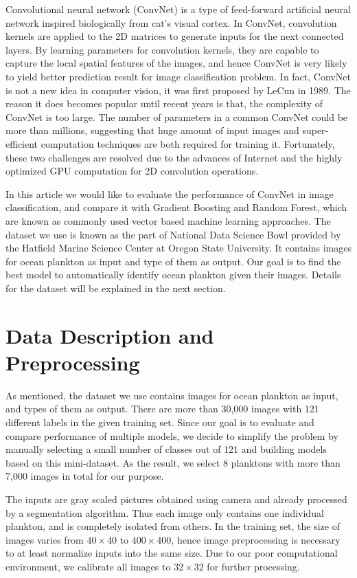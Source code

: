 \documentclass[11pt,oneside,a4paper]{article}
\numberwithin{equation}{section}
\begin{document}
Convolutional neural network (ConvNet) is a type of feed-forward artificial neural network inspired biologically from cat's visual cortex\cite{hubel1968receptive}. In ConvNet, convolution kernels are applied to the 2D matrices to generate inputs for the next connected layers. By learning parameters for convolution kernels, they are capable to capture the local spatial features of the images, and hence ConvNet is very likely to yield better prediction result for image classification problem. In fact, ConvNet is not a new idea in computer vision, it was first proposed by LeCun\cite{lecun1989generalization} in 1989. The reason it does becomes popular until recent years is that, the complexity of ConvNet is too large. The number of parameters in a common ConvNet could be more than millions, suggesting that huge amount of input images and super-efficient computation techniques are both required for training it. Fortunately, these two challenges are resolved due to the advances of Internet and the highly optimized GPU computation for 2D convolution operations.

In this article we would like to evaluate the performance of ConvNet in image classification, and compare it with Gradient Boosting and Random Forest, which are known as commonly used vector based machine learning approaches. The dataset we use is known as the part of National Data Science Bowl provided by the Hatfield Marine Science Center at Oregon State University. It contains images for ocean plankton as input and type of them as output. Our goal is to find the best model to automatically identify ocean plankton given their images. Details for the dataset will be explained in the next section.

\section{Data Description and Preprocessing}
As mentioned, the dataset we use contains images for ocean plankton as input, and types of them as output. There are more than 30,000 images with 121 different labels in the given training set. Since our goal is to evaluate and compare performance of multiple models, we decide to simplify the problem by manually selecting a small number of classes out of 121 and building models based on this mini-dataset. As the result, we select 8 planktons with more than 7,000 images in total for our purpose.

The inputs are gray scaled pictures obtained using camera and already processed by a segmentation algorithm. Thus each image only contains one individual plankton, and is completely isolated from others. In the training set, the size of images varies from $40 \times 40$ to $400 \times 400$, hence image preprocessing is necessary to at least normalize inputs into the same size. Due to our poor computational environment, we calibrate all images to $32 \times 32$ for further processing.
\end{document}
